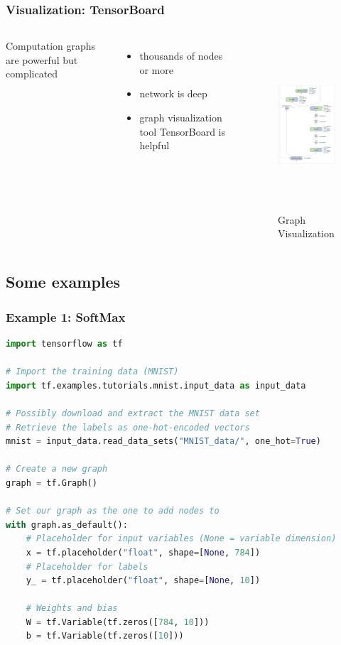 \begin{frame}
  \MyLogo
  \frametitle{Visualization: TensorBoard}  

\begin{columns}
\scriptsize{
Computation graphs are powerful but complicated
\begin{itemize}
\item  thousands of nodes or more 
\item  network is deep
\item  graph visualization tool TensorBoard is helpful
\end{itemize}
}
%
\begin{figure}[htbp] 
   \includegraphics[height=2.5in]{figures/graphvisualization.png} 
\caption{Graph Visualization}
\end{figure}
\end{columns}

\end{frame}

\subsection{Some examples}

\begin{frame}[fragile]
  \MyLogo
  \frametitle{Example 1: SoftMax}  
 
\scriptsize{
\begin{lstlisting}[language=python]
import tensorflow as tf

# Import the training data (MNIST)
import tf.examples.tutorials.mnist.input_data as input_data

# Possibly download and extract the MNIST data set
# Retrieve the labels as one-hot-encoded vectors
mnist = input_data.read_data_sets("MNIST_data/", one_hot=True)

# Create a new graph
graph = tf.Graph()

# Set our graph as the one to add nodes to
with graph.as_default():
	# Placeholder for input variables (None = variable dimension)
	x = tf.placeholder("float", shape=[None, 784])
	# Placeholder for labels
	y_ = tf.placeholder("float", shape=[None, 10])
	
	# Weights and bias
	W = tf.Variable(tf.zeros([784, 10]))
	b = tf.Variable(tf.zeros([10])) 
\end{lstlisting}
}
\end{frame}

